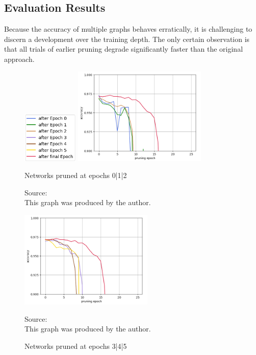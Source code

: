 \subsection*{Evaluation Results}
Because the accuracy of multiple graphs behaves erratically, it is challenging to discern a development over the training depth. The only certain observation is that all trials of earlier pruning degrade significantly faster than the original approach.
\begin{figure}[h]
	\begin{minipage}{\textwidth}
		\centering
		\includegraphics[width=100px]{gfx/7-Evaluation/LTH_5_legend.png}
	\end{minipage}
	\begin{minipage}{0.45\textwidth}
		\centering
		\includegraphics[height=175px]{gfx/Experiments/EarlyTicket-MNIST-FCN/012.png}
		\caption{Networks pruned at epochs 0|1|2}
		\vspace{7pt}
		\footnotesize{
			Source:\\
			This graph was produced by the author.
		}
		\label{fig:Early-Tickets-0}
	\end{minipage}\hfill
	\begin{minipage}{0.45\textwidth}
		\centering
		\includegraphics[height=175px]{gfx/Experiments/EarlyTicket-MNIST-FCN/345.png}
		\caption{Networks pruned at epochs 3|4|5}
		\vspace{7pt}
		\footnotesize{
			Source:\\
			This graph was produced by the author.
		}
		\label{fig:Early-Tickets-4}
	\end{minipage}
\end{figure}
